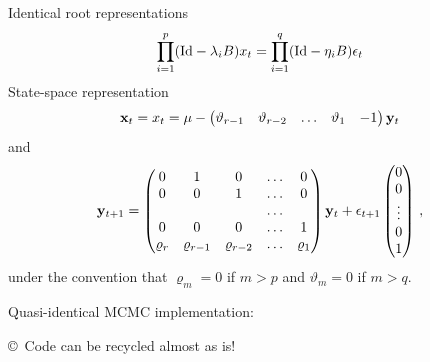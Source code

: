 \begin{slide}
\end{slide}\begin{slide}
Identical root representations
\small{$$
\prod_{i=1}^p (\hbox{Id} - \lambda_i B) x_t =
\prod_{i=1}^q (\hbox{Id} - \eta_i B) \epsilon_t
$$}
\pause
State-space representation
$$
 \mathbf{x}_t = x_t = \mu - \left( \begin{matrix} \vartheta_{r-1} &\vartheta_{r-2}
 &\ldots &\vartheta_1 &-1\end{matrix}\right) {\mathbf y}_t
$$
and
\footnotesize
$$
{\mathbf y}_{t+1} =  \left( \begin{matrix}
    0 &1 &0 &\ldots &0\cr
    0 &0 &1 &\ldots &0\cr
    &  &  &\ldots & \cr
    0 &0 &0 &\ldots &1\cr
    \varrho_r &\varrho_{r-1} &\varrho_{r-2} &\ldots &\varrho_1\cr
        \end{matrix} \right) {\mathbf y}_t + \epsilon_{t+1} \left( \begin{matrix}
                0\cr 0\cr \vdots\cr 0\cr 1\cr \end{matrix} \right) \,,
$$\normalsize
under the convention that
$\varrho_m=0$ if $m>p$ and $\vartheta_m=0$ if $m>q$.

\end{slide}\begin{slide}

Quasi-identical MCMC implementation:
\colorbox{LightGrey}{}

\vs\pause
\copyright~Code can be recycled almost as is!

\end{slide}

